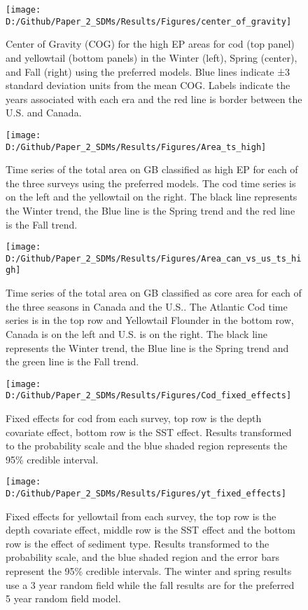 \documentclass[
]{article}
\begin{document}
\begin{landscape}
\newpage
\begin{figure}
\texttt{[image: D:/Github/Paper\_2\_SDMs/Results/Figures/center\_of\_gravity]} \caption{Center of Gravity (COG) for the high EP areas for cod (top panel) and yellowtail (bottom panels) in the Winter (left), Spring (center), and Fall (right) using the preferred models.  Blue lines indicate ±3 standard deviation units from the mean COG. Labels indicate the years associated with each era and the red line is border between the U.S. and Canada.}\label{fig:cog-hep}
\end{figure}

\newpage
\begin{figure}
\texttt{[image: D:/Github/Paper\_2\_SDMs/Results/Figures/Area\_ts\_high]} \caption{Time series of the total area on GB classified as high EP for each of the three surveys using the preferred models.  The cod time series is on the left and the yellowtail on the right.  The black line represents the Winter trend, the Blue line is the Spring trend and the red line is the Fall trend.  }\label{fig:area-hep}
\end{figure}

\newpage
\begin{figure}
\texttt{[image: D:/Github/Paper\_2\_SDMs/Results/Figures/Area\_can\_vs\_us\_ts\_high]} \caption{Time series of the total area on GB classified as core area for each of the three seasons in Canada and the U.S..  The Atlantic Cod time series is in the top row and Yellowtail Flounder in the bottom row, Canada is on the left and U.S. is on the right.  The black line represents the Winter trend, the Blue line is the Spring trend and the green line is the Fall trend.  }\label{fig:area-can-vs-us-hep}
\end{figure}

\newpage
\begin{figure}
\texttt{[image: D:/Github/Paper\_2\_SDMs/Results/Figures/Cod\_fixed\_effects]} \caption{Fixed effects for cod from each survey, top row is the depth covariate effect, bottom row is the SST effect. Results transformed to the probability scale and the blue shaded region represents the 95\% credible interval.}\label{fig:cod-fe}
\end{figure}

\newpage
\begin{figure}
\texttt{[image: D:/Github/Paper\_2\_SDMs/Results/Figures/yt\_fixed\_effects]} \caption{Fixed effects for yellowtail from each survey, the top row is the depth covariate effect, middle row is the SST effect and the bottom row is the effect of sediment type. Results transformed to the probability scale, and the blue shaded region and the error bars represent the 95\% credible intervals. The winter and spring results use a 3 year random field while the fall results are for the preferred 5 year random field model.}\label{fig:yt-fe}
\end{figure}


\end{landscape}
\end{document}
